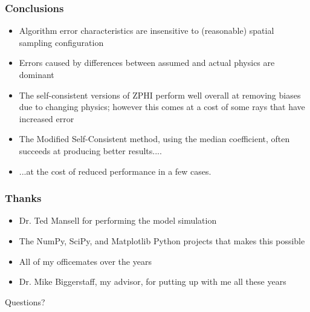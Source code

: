 \documentclass[red]{beamer}
\begin{document}
\begin{frame}[<+->]
	\frametitle{Conclusions}
	\begin{itemize}
		\item Algorithm error characteristics are insensitive to (reasonable) spatial sampling configuration
		\item Errors caused by differences between assumed and actual physics are dominant
		\item The self-consistent versions of ZPHI perform well overall at removing biases due to changing physics; however this comes
		at a cost of some rays that have increased error
		\item The Modified Self-Consistent method, using the median coefficient,
		often succeeds at producing better results....
		\item ...at the cost of reduced performance in a few cases.
	\end{itemize}
\end{frame}

\begin{frame}
	\frametitle{Thanks}
	\begin{itemize}
		\item Dr. Ted Mansell for performing the model simulation
		\item The NumPy, SciPy, and Matplotlib Python projects that makes this possible
		\item All of my officemates over the years
		\item Dr. Mike Biggerstaff, my advisor, for putting up with me all these years
	\end{itemize}
	\begin{center}
		\large{Questions?}
	\end{center}
\end{frame}
\end{document}
